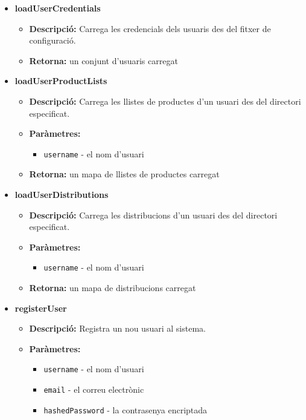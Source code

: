 \documentclass[a4paper, t]{article}
\begin{document}
\begin{itemize}
\item \textbf{loadUserCredentials}
\begin{itemize}
    \item \textbf{Descripció:} Carrega les credencials dels usuaris des del fitxer de configuració.
    \item \textbf{Retorna:} un conjunt d'usuaris carregat
\end{itemize}

\item \textbf{loadUserProductLists}
\begin{itemize}
    \item \textbf{Descripció:} Carrega les llistes de productes d'un usuari des del directori especificat.
    \item \textbf{Paràmetres:}
    \begin{itemize}
        \item \texttt{username} - el nom d'usuari
    \end{itemize}
    \item \textbf{Retorna:} un mapa de llistes de productes carregat
\end{itemize}

\item \textbf{loadUserDistributions}
\begin{itemize}
    \item \textbf{Descripció:} Carrega les distribucions d'un usuari des del directori especificat.
    \item \textbf{Paràmetres:}
    \begin{itemize}
        \item \texttt{username} - el nom d'usuari
    \end{itemize}
    \item \textbf{Retorna:} un mapa de distribucions carregat
\end{itemize}

\item \textbf{registerUser}
\begin{itemize}
    \item \textbf{Descripció:} Registra un nou usuari al sistema.
    \item \textbf{Paràmetres:}
    \begin{itemize}
        \item \texttt{username} - el nom d'usuari
        \item \texttt{email} - el correu electrònic
        \item \texttt{hashedPassword} - la contrasenya encriptada
    \end{itemize}
\end{itemize}
\end{itemize}
\end{document}
